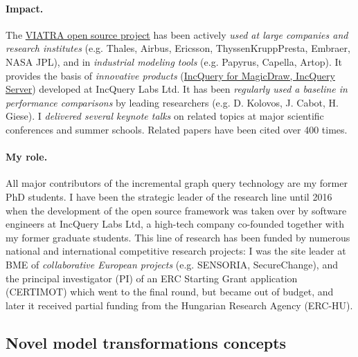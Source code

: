 \paragraph{Impact.}
The \href{https://www.eclipse.org/viatra/}{VIATRA open source project} has been actively \emph{used at large companies and research institutes} (e.g. Thales, Airbus, Ericsson, ThyssenKruppPresta, Embraer, NASA JPL), and in \emph{industrial modeling tools} (e.g. Papyrus, Capella, Artop). It provides the basis of \emph{innovative products} (\href{https://incquerylabs.com/incquery/}{IncQuery for MagicDraw, IncQuery Server}) developed at IncQuery Labs Ltd. It has been \emph{regularly used a baseline in performance comparisons} by leading researchers (e.g. D. Kolovos, J. Cabot, H. Giese). I \emph{delivered several keynote talks} on related topics at major scientific conferences and summer schools. Related papers \cite{models-2010-incquery,icmt2011,ase2011-tool,ecmfa2011,models2014-iqd,scp2015,icgt2015,sosym2016-viatra-invited} have been cited over 400 times. 

\paragraph{My role.}
All major contributors of the incremental graph query technology are my former PhD students. I have been the strategic leader of the research line until 2016 when the development of the open source framework was taken over by software engineers at IncQuery Labs Ltd, a high-tech company co-founded together with my former graduate students. This line of research has been funded by numerous national and international competitive research projects: I was the site leader at BME of \emph{collaborative European projects} (e.g. SENSORIA, SecureChange), and the principal investigator (PI) of an ERC Starting Grant application (CERTIMOT) which went to the final round, but became out of budget, and later it received partial funding from the Hungarian Research Agency (ERC-HU). 


\subsection{Novel model transformations concepts}

